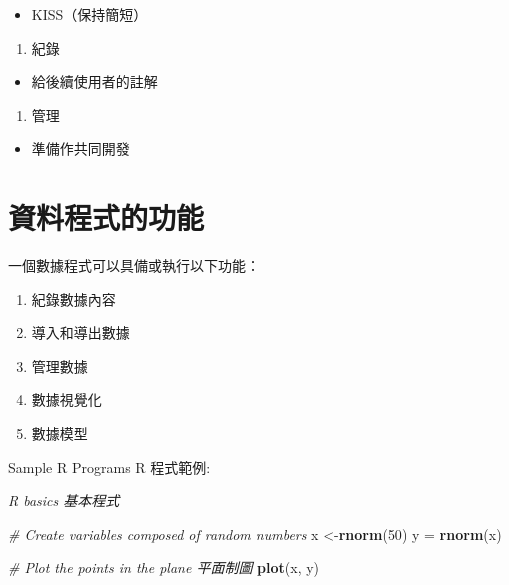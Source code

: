 \documentclass[]{book}
\newenvironment{Shaded}{\begin{snugshade}}{\end{snugshade}}
\newcommand{\CommentTok}[1]{\textcolor[rgb]{0.56,0.35,0.01}{\textit{#1}}}
\newcommand{\DecValTok}[1]{\textcolor[rgb]{0.00,0.00,0.81}{#1}}
\newcommand{\KeywordTok}[1]{\textcolor[rgb]{0.13,0.29,0.53}{\textbf{#1}}}
\newcommand{\NormalTok}[1]{#1}
\newcommand{\StringTok}[1]{\textcolor[rgb]{0.31,0.60,0.02}{#1}}
\providecommand{\tightlist}{%
  \setlength{\itemsep}{0pt}\setlength{\parskip}{0pt}}
\begin{document}
\begin{itemize}
\tightlist
\item
  KISS（保持簡短）
\end{itemize}

\begin{enumerate}
\def\labelenumi{\arabic{enumi}.}
\setcounter{enumi}{5}
\tightlist
\item
  紀錄
\end{enumerate}

\begin{itemize}
\tightlist
\item
  給後續使用者的註解
\end{itemize}

\begin{enumerate}
\def\labelenumi{\arabic{enumi}.}
\setcounter{enumi}{6}
\tightlist
\item
  管理
\end{enumerate}

\begin{itemize}
\tightlist
\item
  準備作共同開發
\end{itemize}

\hypertarget{section-2}{%
\section{資料程式的功能}\label{section-2}}

一個數據程式可以具備或執行以下功能：

\begin{enumerate}
\def\labelenumi{\arabic{enumi}.}
\tightlist
\item
  紀錄數據內容
\item
  導入和導出數據
\item
  管理數據
\item
  數據視覺化
\item
  數據模型
\end{enumerate}

Sample R Programs R 程式範例:

\emph{R basics 基本程式}

\begin{Shaded}
\begin{Highlighting}[]
\CommentTok{# Create variables composed of random numbers}
\NormalTok{x <-}\KeywordTok{rnorm}\NormalTok{(}\DecValTok{50}\NormalTok{) }
\NormalTok{y =}\StringTok{ }\KeywordTok{rnorm}\NormalTok{(x)}

\CommentTok{# Plot the points in the plane 平面制圖 }
\KeywordTok{plot}\NormalTok{(x, y)}
\end{Highlighting}
\end{Shaded}
\end{document}
